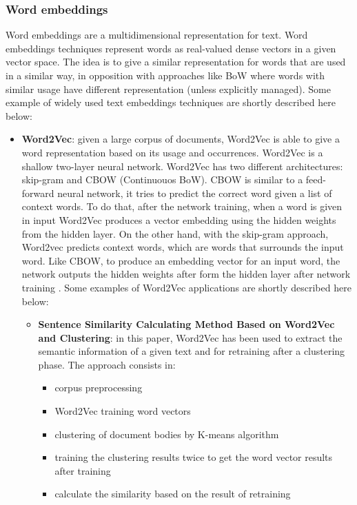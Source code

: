 \documentclass[\main/main.tex]{subfiles}
\begin{document}
\subsubsection{Word embeddings}
Word embeddings are a multidimensional representation for text. Word embeddings techniques represent words as real-valued dense vectors in a given vector space. The idea is to give a similar representation for words that are used in a similar way, in opposition with approaches like BoW where words with similar usage have different representation (unless explicitly managed). Some example of widely used text embeddings techniques are shortly described here below:
\begin{itemize}
    \item \textbf{Word2Vec}: given a large corpus of documents, Word2Vec is able to give a word representation based on its usage and occurrences. Word2Vec is a shallow two-layer neural network. Word2Vec has two different architectures: skip-gram and CBOW (Continuouos BoW). CBOW is similar to a feed-forward neural network, it tries to predict the correct word given a list of context words. To do that, after the network training, when a word is given in input Word2Vec produces a vector embedding using the hidden weights from the hidden layer. On the other hand, with the skip-gram approach, Word2vec predicts context words, which are words that surrounds the input word. Like CBOW, to produce an embedding vector for an input word, the network outputs the hidden weights after form the hidden layer after network training \cite{mikolov2013efficient}. Some examples of Word2Vec applications are shortly described here below:
    \begin{itemize}
        \item \textbf{Sentence Similarity Calculating Method Based on Word2Vec and Clustering}: in this paper, Word2Vec has been used to extract the semantic information of a given text and for retraining after a clustering phase. The approach consists in: 
        \begin{itemize}
            \item corpus preprocessing
            \item Word2Vec training word vectors
            \item clustering of document bodies by K-means algorithm
            \item training the clustering results twice to get the word vector results after training
            \item calculate the similarity based on the result of retraining

\end{itemize}
\end{itemize}
\end{itemize}
\end{document}
